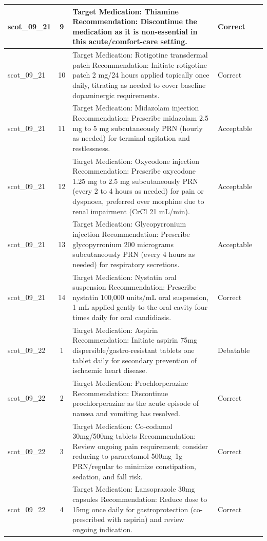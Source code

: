 \begin{longtable}{|p{1.45cm}|c|p{10.2cm}|p{1.55cm}|p{2.3cm}|}
\hline
scot\_09\_21 & 9 & Target Medication: Thiamine Recommendation: Discontinue the medication as it is non-essential in this acute/comfort-care setting. & Correct &  \\
\hline
scot\_09\_21 & 10 & Target Medication: Rotigotine transdermal patch Recommendation: Initiate rotigotine patch 2 mg/24 hours applied topically once daily, titrating as needed to cover baseline dopaminergic requirements. & Correct &  \\
\hline
scot\_09\_21 & 11 & Target Medication: Midazolam injection Recommendation: Prescribe midazolam 2.5 mg to 5 mg subcutaneously PRN (hourly as needed) for terminal agitation and restlessness. & Acceptable &  \\
\hline
scot\_09\_21 & 12 & Target Medication: Oxycodone injection Recommendation: Prescribe oxycodone 1.25 mg to 2.5 mg subcutaneously PRN (every 2 to 4 hours as needed) for pain or dyspnoea, preferred over morphine due to renal impairment (CrCl 21 mL/min). & Acceptable &  \\
\hline
scot\_09\_21 & 13 & Target Medication: Glycopyrronium injection Recommendation: Prescribe glycopyrronium 200 micrograms subcutaneously PRN (every 4 hours as needed) for respiratory secretions. & Acceptable &  \\
\hline
scot\_09\_21 & 14 & Target Medication: Nystatin oral suspension Recommendation: Prescribe nystatin 100,000 units/mL oral suspension, 1 mL applied gently to the oral cavity four times daily for oral candidiasis. & Correct &  \\
\hline
scot\_09\_22 & 1 & Target Medication: Aspirin Recommendation: Initiate aspirin 75mg dispersible/gastro-resistant tablets one tablet daily for secondary prevention of ischaemic heart disease. & Debatable &  \\
\hline
scot\_09\_22 & 2 & Target Medication: Prochlorperazine Recommendation: Discontinue prochlorperazine as the acute episode of nausea and vomiting has resolved. & Correct &  \\
\hline
scot\_09\_22 & 3 & Target Medication: Co-codamol 30mg/500mg tablets Recommendation: Review ongoing pain requirement; consider reducing to paracetamol 500mg–1g PRN/regular to minimize constipation, sedation, and fall risk. & Correct &  \\
\hline
scot\_09\_22 & 4 & Target Medication: Lansoprazole 30mg capsules Recommendation: Reduce dose to 15mg once daily for gastroprotection (co-prescribed with aspirin) and review ongoing indication. & Correct &  \\

\end{longtable}
